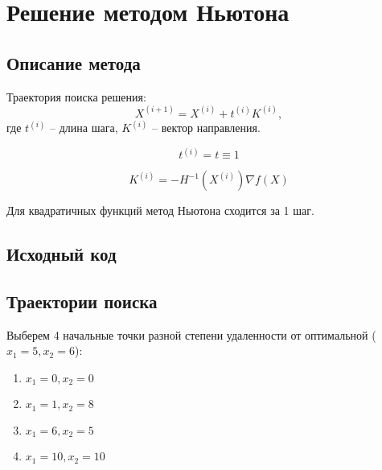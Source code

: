 \section{Решение методом Ньютона}

\subsection{Описание метода}

Траектория поиска решения:
\begin{equation*}
X^{(i+1)}  = X^{(i)} + t^{(i)} K^{(i)},
\end{equation*}
где $t^{(i)}$ -- длина шага, $K^{(i)}$ -- вектор направления.

\begin{equation*}
t^{(i)} = t \equiv 1
\end{equation*}

\begin{equation*}
K^{(i)} = -H^{-1}\left(X^{(i)}\right) \nabla f(X)
\end{equation*}

Для квадратичных функций метод Ньютона сходится за 1 шаг.

\subsection{Исходный код}



\subsection{Траектории поиска}

Выберем 4 начальные точки разной степени удаленности от оптимальной ($x_1 = 5, x_2 = 6$): 
\begin{multicols}{2} 
\begin{enumerate}
	\setlength{\itemsep}{0em}
	\item $x_1 = 0, x_2 = 0$
	\item $x_1 = 1, x_2 = 8$
	\item $x_1 = 6, x_2 = 5$
	\item $x_1 = 10, x_2 = 10$
\end{enumerate}
\end{multicols}

